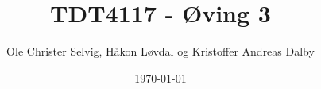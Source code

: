 \documentclass[]{article}
\begin{document}
\title{TDT4117 - Øving 3}
\author{Ole Christer Selvig, Håkon Løvdal og Kristoffer Andreas Dalby}
\date{\today}
\maketitle

\pagebreak






\end{document}
